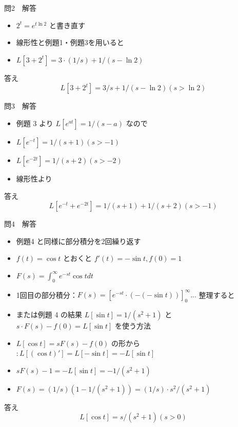 \documentclass[aspectratio=43,professionalfonts,handout]{beamer}
\begin{document}
\begin{frame}{問2　解答}
  \begin{block}{}
  \begin{itemize}\setlength{\itemsep}{2pt}
    \item $2^t = e^{t \ln 2}$ と書き直す
    \item 線形性と例題1・例題3を用いると
    \item $L[3 + 2^t] = 3\cdot(1/s) + 1/(s - \ln 2)$
  \end{itemize}
  \end{block}
  \begin{exampleblock}{答え}
    \[
    L[3 + 2^t] = 3/s + 1/(s - \ln 2)  (s > \ln 2)
  \]
  \end{exampleblock}
\end{frame}

\begin{frame}{問3　解答}
  \begin{block}{}
  \begin{itemize}\setlength{\itemsep}{2pt}
    \item 例題 3 より $L[e^{at}] = 1/(s-a)$ なので
    \item $L[e^{-t}] = 1/(s+1)  (s > -1)$
    \item $L[e^{-2t}] = 1/(s+2)  (s > -2)$
    \item 線形性より
  \end{itemize}
  \end{block}
  \begin{exampleblock}{答え}
    \[
    L[e^{-t} + e^{-2t}] = 1/(s+1) + 1/(s+2)  (s > -1)
  \]
  \end{exampleblock}
\end{frame}

\begin{frame}{問4　解答}
  \begin{block}{}
  \begin{itemize}\setlength{\itemsep}{2pt}
    \item 例題4 と同様に部分積分を2回繰り返す
    \item $f(t) = \cos t$ とおくと $f'(t) = -\sin t, f(0) = 1$
    \item $F(s) = \int_{0}^\infty e^{-st} \cos t dt$
    \item 1回目の部分積分：$F(s) = [e^{-st}\cdot(-(-\sin t))]_{0}^\infty ...$ 整理すると
    \item または例題 4 の結果 $L[\sin t] = 1/(s^{2}+1)$ と $s\cdot F(s) - f(0) = L[\sin t]$ を使う方法
    \item $L[\cos t] = sF(s) - f(0)$ の形から $: L[(\cos t)'] = L[-\sin t] = -L[\sin t]$
    \item $sF(s) - 1 = -L[\sin t] = -1/(s^{2}+1)$
    \item $F(s) = (1/s)(1 - 1/(s^{2}+1)) = (1/s)\cdot s^{2}/(s^{2}+1)$
  \end{itemize}
  \end{block}
  \begin{exampleblock}{答え}
    \[
    L[\cos t] = s/(s^{2}+1)  (s > 0)
  \]
  \end{exampleblock}
\end{frame}
\end{document}
